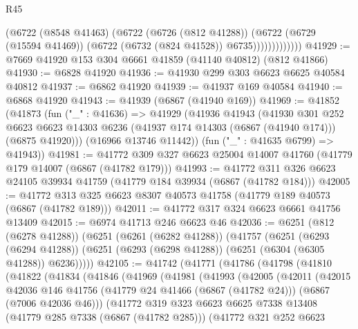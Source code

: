 \begin{lexlean}{R45}
\begin{coremodule}
{                      (@6722
                        (@8548 @41463)
                        (@6722
                          (@6726 (@812 @41288))
                          (@6722
                            (@6729 (@15594 @41469))
                            (@6722 (@6732 (@824 @41528)) @6735)))))))))))))
@41929 := @7669 @41920 @153 @304 @6661 @41859 (@41140 @40812) (@812 @41866)
@41930 := @6828 @41920
@41936 := @41930 @299 @303 @6623 @6625 @40584 @40812
@41937 := @6862 @41920
@41939 := @41937 @169 @40584
@41940 := @6868 @41920
@41943 := @41939 (@6867 (@41940 @169))
@41969 := @41852
    (@41873
      (fun ("_" : @41636) =>
      @41929
        (@41936
          @41943
          (@41930
            @301
            @252
            @6623
            @6623
            @14303
            @6236
            (@41937 @174 @14303 (@6867 (@41940 @174)))
            (@6875 @41920)))
        (@16966 @13746 @11442))
      (fun ("_" : @41635 @6799) => @41943))
@41981 := @41772 @309 @327 @6623 @25004 @14007 @41760 (@41779 @179 @14007 (@6867 (@41782 @179)))
@41993 := @41772 @311 @326 @6623 @24105 @39934 @41759 (@41779 @184 @39934 (@6867 (@41782 @184)))
@42005 := @41772 @313 @325 @6623 @8307 @40573 @41758 (@41779 @189 @40573 (@6867 (@41782 @189)))
@42011 := @41772 @317 @324 @6623 @6661 @41756 @13409
@42015 := @6974 @41713 @246 @6623 @46
@42036 := @6251
    (@812 (@6278 @41288))
    (@6251
      (@6261 (@6282 @41288))
      (@41757
        (@6251
          (@6293 (@6294 @41288))
          (@6251 (@6293 (@6298 @41288)) (@6251 (@6304 (@6305 @41288)) @6236)))))
@42105 := @41742
    (@41771
      (@41786
        (@41798
          (@41810
            (@41822
              (@41834
                (@41846
                  (@41969
                    (@41981
                      (@41993
                        (@42005
                          (@42011
                            (@42015
                              @42036
                              @146
                              @41756
                              (@41779 @24 @41466 (@6867 (@41782 @24)))
                              (@6867 (@7006 @42036 @46)))
                            (@41772
                              @319
                              @323
                              @6623
                              @6625
                              @7338
                              @13408
                              (@41779 @285 @7338 (@6867 (@41782 @285)))
                              (@41772
                                @321
                                @252
                                @6623
}
\end{coremodule}
\end{lexlean}
